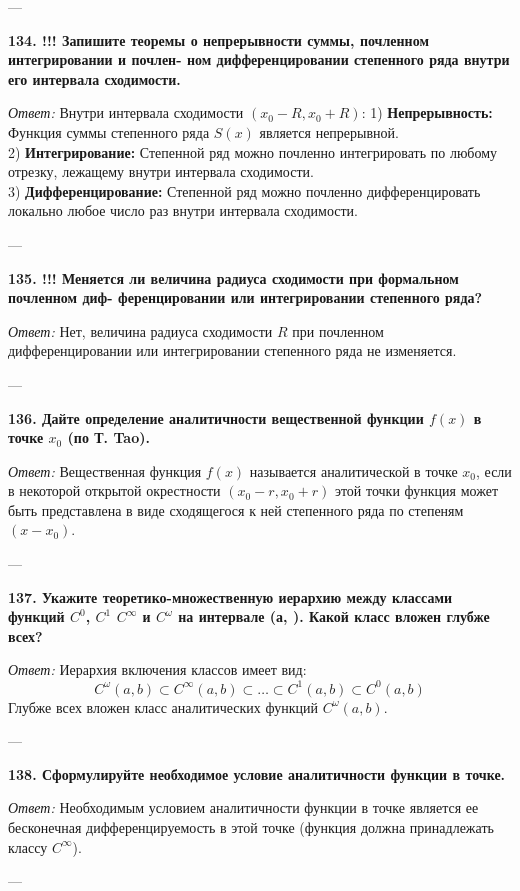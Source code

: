 \documentclass{article}
\begin{document}
---

\textbf{134. !!! Запишите теоремы о непрерывности суммы, почленном интегрировании и почлен- ном дифференцировании степенного ряда внутри его интервала сходимости.}

\textit{Ответ:} Внутри интервала сходимости $(x_0 - R, x_0 + R)$:
1) \textbf{Непрерывность:} Функция суммы степенного ряда $S(x)$ является непрерывной. \\
2) \textbf{Интегрирование:} Степенной ряд можно почленно интегрировать по любому отрезку, лежащему внутри интервала сходимости. \\
3) \textbf{Дифференцирование:} Степенной ряд можно почленно дифференцировать локально любое число раз внутри интервала сходимости.

---

\textbf{135. !!! Меняется ли величина радиуса сходимости при формальном почленном диф- ференцировании или интегрировании степенного ряда?}

\textit{Ответ:} Нет, величина радиуса сходимости $R$ при почленном дифференцировании или интегрировании степенного ряда не изменяется.

---

\textbf{136. Дайте определение аналитичности вещественной функции $f(x)$ в точке $x_{0}$ (по Т. Tao).}

\textit{Ответ:} Вещественная функция $f(x)$ называется аналитической в точке $x_0$, если в некоторой открытой окрестности $(x_0 - r, x_0 + r)$ этой точки функция может быть представлена в виде сходящегося к ней степенного ряда по степеням $(x-x_0)$.

---

\textbf{137. Укажите теоретико-множественную иерархию между классами функций $C^{0}$, $C^{1}$ $C^{\infty}$ и $C^{\omega}$ на интервале (а, ). Какой класс вложен глубже всех?}

\textit{Ответ:} Иерархия включения классов имеет вид:
$$ C^\omega(a,b) \subset C^\infty(a,b) \subset \dots \subset C^1(a,b) \subset C^0(a,b) $$
Глубже всех вложен класс аналитических функций $C^\omega(a,b)$.

---

\textbf{138. Сформулируйте необходимое условие аналитичности функции в точке.}

\textit{Ответ:} Необходимым условием аналитичности функции в точке является ее бесконечная дифференцируемость в этой точке (функция должна принадлежать классу $C^\infty$).

---
\end{document}
